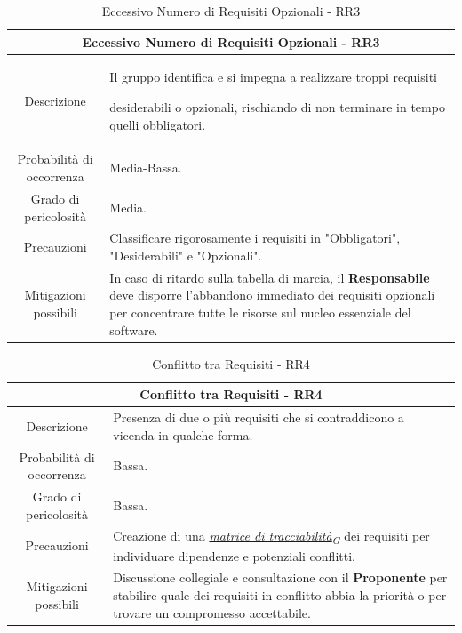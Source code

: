 \documentclass[12pt, a4paper]{article}
\newcommand{\urlglossario}{https://skynetunigroup.github.io/Code_Guardian/Documentazione/RTB/glossario_v1.0.0.pdf} %
\newcommand{\glo}[2]{\href{\urlglossario\#nameddest=#2}{#1\textsubscript{G}}}
\begin{document}
{\begin{table}[H]
    \centering
    \renewcommand{\arraystretch}{1.3}
    \begin{tabularx}{\textwidth}{|c|X|}
        \hline
        \multicolumn{2}{|c|}{\textbf{Eccessivo Numero di Requisiti Opzionali - RR3}} \\ \hline
        Descrizione & 
        Il gruppo identifica e si impegna a realizzare troppi requisiti
 
        desiderabili o opzionali, rischiando di non terminare in tempo quelli
        obbligatori.
\\ \hline
        Probabilità di occorrenza & Media-Bassa.
\\ \hline
        Grado di pericolosità & Media.
\\ \hline
        Precauzioni & 
        Classificare rigorosamente i requisiti in "Obbligatori", "Desiderabili"
        e "Opzionali".
\\ \hline
        Mitigazioni possibili &
        In caso di ritardo sulla tabella di marcia, il \textbf{Responsabile} deve
        disporre l'abbandono immediato dei requisiti opzionali
        per concentrare tutte le risorse sul nucleo essenziale del software.\\ \hline
    \end{tabularx}
    \caption{Eccessivo Numero di Requisiti Opzionali - RR3}
\end{table}

\begin{table}[H]
    \centering
    \renewcommand{\arraystretch}{1.3}
    \begin{tabularx}{\textwidth}{|c|X|}
        \hline
     
        \multicolumn{2}{|c|}{\textbf{Conflitto tra Requisiti - RR4}} \\ \hline
        Descrizione &
        Presenza di due o più requisiti che si contraddicono a vicenda in
        qualche forma.
\\ \hline
        Probabilità di occorrenza & Bassa.
\\ \hline
        Grado di pericolosità & Bassa.
\\ \hline
        Precauzioni &
        Creazione di una \textit{\glo{matrice di tracciabilità}{matrice-di-tracciabilita}} dei requisiti per individuare
        dipendenze e potenziali conflitti.
\\ \hline
        Mitigazioni possibili &
        Discussione collegiale e consultazione con il \textbf{Proponente} per stabilire
        quale dei requisiti in conflitto abbia la priorità o per trovare un
        compromesso accettabile.
\\ \hline
    \end{tabularx}
    \caption{Conflitto tra Requisiti - RR4}
\end{table}

}
\end{document}
